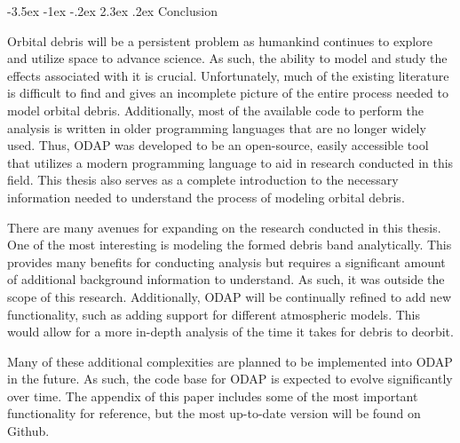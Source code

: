 \documentclass[a4paper, 12pt]{article}
\makeatletter
\renewcommand\section{\clearpage\newpage\@startsection {section}{1}{\z@}%
	{-3.5ex \@plus -1ex \@minus -.2ex}%
	{2.3ex \@plus.2ex}%
	{\normalfont\Large\bfseries}}
\makeatother
\begin{document}
\section{Conclusion}

Orbital debris will be a persistent problem as humankind continues to explore and utilize space to advance science. As such, the ability to model and study the effects associated with it is crucial. Unfortunately, much of the existing literature is difficult to find and gives an incomplete picture of the entire process needed to model orbital debris. Additionally, most of the available code to perform the analysis is written in older programming languages that are no longer widely used. Thus, ODAP was developed to be an open-source, easily accessible tool that utilizes a modern programming language to aid in research conducted in this field. This thesis also serves as a complete introduction to the necessary information needed to understand the process of modeling orbital debris.

There are many avenues for expanding on the research conducted in this thesis. One of the most interesting is modeling the formed debris band analytically. This provides many benefits for conducting analysis but requires a significant amount of additional background information to understand. As such, it was outside the scope of this research. Additionally, ODAP will be continually refined to add new functionality, such as adding support for different atmospheric models. This would allow for a more in-depth analysis of the time it takes for debris to deorbit.

Many of these additional complexities are planned to be implemented into ODAP in the future. As such, the code base for ODAP is expected to evolve significantly over time. The appendix of this paper includes some of the most important functionality for reference, but the most up-to-date version will be found on Github.





\printindex


\end{document}
